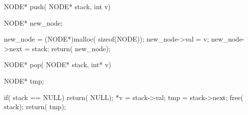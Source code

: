 NODE* push( NODE* stack, int v)
{
        NODE* new_node;

        new_node = (NODE*)malloc( sizeof(NODE));
        new_node->val = v;
        new_node->next = stack;
        return( new_node);
}

NODE* pop( NODE* stack, int* v)
{
        NODE* tmp;

        if( stack == NULL)
                return( NULL);
        *v = stack->val;
        tmp = stack->next;
        free( stack);
        return( tmp);
}


\begin{frame}
  \frameheading{}%
\end{frame}
